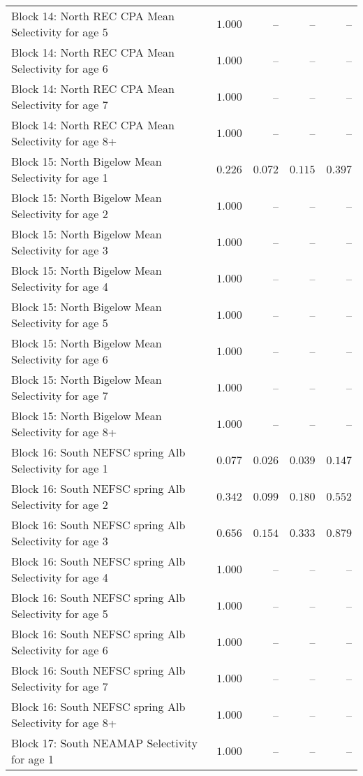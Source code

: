 \documentclass[
]{article}
\begin{document}
\begin{landscape}
\begin{longtable}[t]{lrrrr}
\addlinespace
Block 14: North REC CPA Mean Selectivity for age 5 & $1.000$ & -- & -- & --\\
Block 14: North REC CPA Mean Selectivity for age 6 & $1.000$ & -- & -- & --\\
Block 14: North REC CPA Mean Selectivity for age 7 & $1.000$ & -- & -- & --\\
Block 14: North REC CPA Mean Selectivity for age 8+ & $1.000$ & -- & -- & --\\
Block 15: North Bigelow Mean Selectivity for age 1 & $0.226$ & $0.072$ & $0.115$ & $0.397$\\
\addlinespace
Block 15: North Bigelow Mean Selectivity for age 2 & $1.000$ & -- & -- & --\\
Block 15: North Bigelow Mean Selectivity for age 3 & $1.000$ & -- & -- & --\\
Block 15: North Bigelow Mean Selectivity for age 4 & $1.000$ & -- & -- & --\\
Block 15: North Bigelow Mean Selectivity for age 5 & $1.000$ & -- & -- & --\\
Block 15: North Bigelow Mean Selectivity for age 6 & $1.000$ & -- & -- & --\\
\addlinespace
Block 15: North Bigelow Mean Selectivity for age 7 & $1.000$ & -- & -- & --\\
Block 15: North Bigelow Mean Selectivity for age 8+ & $1.000$ & -- & -- & --\\
Block 16: South NEFSC spring Alb Selectivity for age 1 & $0.077$ & $0.026$ & $0.039$ & $0.147$\\
Block 16: South NEFSC spring Alb Selectivity for age 2 & $0.342$ & $0.099$ & $0.180$ & $0.552$\\
Block 16: South NEFSC spring Alb Selectivity for age 3 & $0.656$ & $0.154$ & $0.333$ & $0.879$\\
\addlinespace
Block 16: South NEFSC spring Alb Selectivity for age 4 & $1.000$ & -- & -- & --\\
Block 16: South NEFSC spring Alb Selectivity for age 5 & $1.000$ & -- & -- & --\\
Block 16: South NEFSC spring Alb Selectivity for age 6 & $1.000$ & -- & -- & --\\
Block 16: South NEFSC spring Alb Selectivity for age 7 & $1.000$ & -- & -- & --\\
Block 16: South NEFSC spring Alb Selectivity for age 8+ & $1.000$ & -- & -- & --\\
\addlinespace
Block 17: South NEAMAP Selectivity for age 1 & $1.000$ & -- & -- & --\\

\end{longtable}
\end{landscape}
\end{document}
